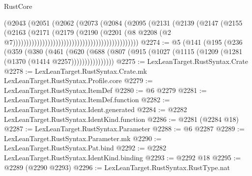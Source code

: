 \begin{lexlean}{RustCore}
\begin{coremodule}
                                                                (@2043
                                                                  (@2051
                                                                    (@2062
                                                                      (@2073
                                                                        (@2084
                                                                          (@2095
                                                                            (@2131
                                                                              (@2139
                                                                                (@2147
                                                                                  (@2155
                                                                                    (@2163
                                                                                      (@2171
                                                                                        (@2179
                                                                                          (@2190
                                                                                            (@2201
                                                                                              (@8
                                                                                                @2208
                                                                                                (@2
                                                                                                  @7)))))))))))))))))))))))))))))))))))))))))))))))
@2274 := @5
    (@141
      (@195
        (@236
          (@359
            (@380
              (@461
                (@620
                  (@688 (@807 (@915 (@1027 (@1115 (@1209 (@1281 (@1370 (@1414 @2257))))))))))))))))
@2275 := LexLeanTarget.RustSyntax.Crate
@2278 := LexLeanTarget.RustSyntax.Crate.mk LexLeanTarget.RustSyntax.Profile.core
@2279 := LexLeanTarget.RustSyntax.ItemDef
@2280 := @6 @2279
@2281 := LexLeanTarget.RustSyntax.ItemDef.function
@2282 := LexLeanTarget.RustSyntax.Ident.generated
@2284 := @2282 LexLeanTarget.RustSyntax.IdentKind.function
@2286 := @2281 (@2284 @18)
@2287 := LexLeanTarget.RustSyntax.Parameter
@2288 := @6 @2287
@2289 := LexLeanTarget.RustSyntax.Parameter.mk
@2290 := LexLeanTarget.RustSyntax.Pat.bind
@2292 := @2282 LexLeanTarget.RustSyntax.IdentKind.binding
@2293 := @2292 @18
@2295 := @2289 (@2290 @2293)
@2296 := LexLeanTarget.RustSyntax.RustType.nat

\end{coremodule}
\end{lexlean}
